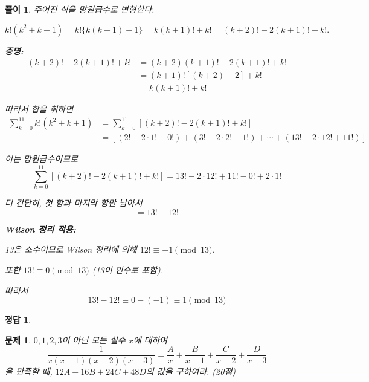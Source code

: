 \documentclass[12pt,a4paper]{article}
\theoremstyle{test_form}
\newtheorem{problem}{문제}[section]
\newtheorem*{solution}{풀이}
\newtheorem*{answer}{정답}
\begin{document}
\begin{solution}

\setlength{\parindent}{0pt}

주어진 식을 망원급수로 변형한다.

\[
k!(k^2+k+1)=k!\{k(k+1)+1\}=k(k+1)!+k!=(k+2)!-2(k+1)!+k!.
\]

\textbf{증명:}
\[
\begin{aligned}
(k+2)!-2(k+1)!+k! &= (k+2)(k+1)!-2(k+1)!+k!\\
&= (k+1)![(k+2)-2]+k!\\
&= k(k+1)!+k!
\end{aligned}
\]

따라서 합을 취하면
\[
\begin{aligned}
\sum_{k=0}^{11}k!(k^2+k+1) &= \sum_{k=0}^{11}[(k+2)!-2(k+1)!+k!]\\
&= [(2!-2\cdot1!+0!)+(3!-2\cdot2!+1!)+\cdots+(13!-2\cdot12!+11!)]
\end{aligned}
\]

이는 망원급수이므로
\[
\sum_{k=0}^{11}[(k+2)!-2(k+1)!+k!]=13!-2\cdot12!+11!-0!+2\cdot1!
\]

더 간단히, 첫 항과 마지막 항만 남아서
\[
=13!-12!
\]

\textbf{Wilson 정리 적용:}

13은 소수이므로 Wilson 정리에 의해 \(12!\equiv-1\pmod{13}\).

또한 \(13!\equiv0\pmod{13}\) (13이 인수로 포함).

따라서
\[
13!-12! \equiv 0-(-1) \equiv 1 \pmod{13}
\]

\end{solution}

\begin{answer}
\hfill {}
\end{answer}

\newpage

\begin{problem}

\(0, 1, 2, 3\)이 아닌 모든 실수 \(x\)에 대하여
\[
\frac{1}{x(x-1)(x-2)(x-3)}=\frac{A}{x}+\frac{B}{x-1}+\frac{C}{x-2}+\frac{D}{x-3}
\]
을 만족할 때, \(12A+16B+24C+48D\)의 값을 구하여라. (20점)

\begin{flushright}\end{flushright}

\end{problem}
\end{document}
